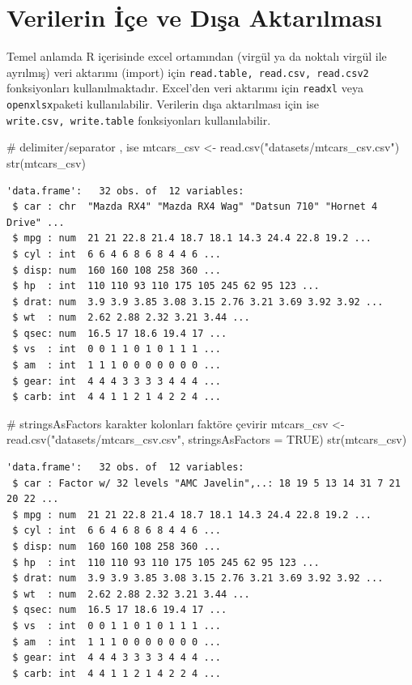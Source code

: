 \documentclass[
  letterpaper,
  DIV=11,
  numbers=noendperiod]{scrreprt}
\newenvironment{Shaded}{\begin{snugshade}}{\end{snugshade}}
\newcommand{\AttributeTok}[1]{\textcolor[rgb]{0.40,0.45,0.13}{#1}}
\newcommand{\CommentTok}[1]{\textcolor[rgb]{0.37,0.37,0.37}{#1}}
\newcommand{\ConstantTok}[1]{\textcolor[rgb]{0.56,0.35,0.01}{#1}}
\newcommand{\FunctionTok}[1]{\textcolor[rgb]{0.28,0.35,0.67}{#1}}
\newcommand{\NormalTok}[1]{\textcolor[rgb]{0.00,0.23,0.31}{#1}}
\newcommand{\OtherTok}[1]{\textcolor[rgb]{0.00,0.23,0.31}{#1}}
\newcommand{\StringTok}[1]{\textcolor[rgb]{0.13,0.47,0.30}{#1}}
\begin{document}
\chapter{Verilerin İçe ve Dışa
Aktarılması}\label{verilerin-iuxe7e-ve-dux131ux15fa-aktarux131lmasux131}

Temel anlamda R içerisinde excel ortamından (virgül ya da noktalı virgül
ile ayrılmış) veri aktarımı (import) için
\texttt{read.table,\ read.csv,\ read.csv2} fonksiyonları
kullanılmaktadır. Excel'den veri aktarımı için \texttt{readxl} veya
\texttt{openxlsx}paketi kullanılabilir. Verilerin dışa aktarılması için
ise \texttt{write.csv,\ write.table} fonksiyonları kullanılabilir.

\begin{Shaded}
\begin{Highlighting}[]
\CommentTok{\# delimiter/separator , ise}
\NormalTok{mtcars\_csv }\OtherTok{\textless{}{-}} \FunctionTok{read.csv}\NormalTok{(}\StringTok{"datasets/mtcars\_csv.csv"}\NormalTok{)}
\FunctionTok{str}\NormalTok{(mtcars\_csv)}
\end{Highlighting}
\end{Shaded}

\begin{verbatim}
'data.frame':   32 obs. of  12 variables:
 $ car : chr  "Mazda RX4" "Mazda RX4 Wag" "Datsun 710" "Hornet 4 Drive" ...
 $ mpg : num  21 21 22.8 21.4 18.7 18.1 14.3 24.4 22.8 19.2 ...
 $ cyl : int  6 6 4 6 8 6 8 4 4 6 ...
 $ disp: num  160 160 108 258 360 ...
 $ hp  : int  110 110 93 110 175 105 245 62 95 123 ...
 $ drat: num  3.9 3.9 3.85 3.08 3.15 2.76 3.21 3.69 3.92 3.92 ...
 $ wt  : num  2.62 2.88 2.32 3.21 3.44 ...
 $ qsec: num  16.5 17 18.6 19.4 17 ...
 $ vs  : int  0 0 1 1 0 1 0 1 1 1 ...
 $ am  : int  1 1 1 0 0 0 0 0 0 0 ...
 $ gear: int  4 4 4 3 3 3 3 4 4 4 ...
 $ carb: int  4 4 1 1 2 1 4 2 2 4 ...
\end{verbatim}

\begin{Shaded}
\begin{Highlighting}[]
\CommentTok{\# stringsAsFactors karakter kolonları faktöre çevirir}
\NormalTok{mtcars\_csv }\OtherTok{\textless{}{-}} \FunctionTok{read.csv}\NormalTok{(}\StringTok{"datasets/mtcars\_csv.csv"}\NormalTok{,}
                       \AttributeTok{stringsAsFactors =} \ConstantTok{TRUE}\NormalTok{)}
\FunctionTok{str}\NormalTok{(mtcars\_csv)}
\end{Highlighting}
\end{Shaded}

\begin{verbatim}
'data.frame':   32 obs. of  12 variables:
 $ car : Factor w/ 32 levels "AMC Javelin",..: 18 19 5 13 14 31 7 21 20 22 ...
 $ mpg : num  21 21 22.8 21.4 18.7 18.1 14.3 24.4 22.8 19.2 ...
 $ cyl : int  6 6 4 6 8 6 8 4 4 6 ...
 $ disp: num  160 160 108 258 360 ...
 $ hp  : int  110 110 93 110 175 105 245 62 95 123 ...
 $ drat: num  3.9 3.9 3.85 3.08 3.15 2.76 3.21 3.69 3.92 3.92 ...
 $ wt  : num  2.62 2.88 2.32 3.21 3.44 ...
 $ qsec: num  16.5 17 18.6 19.4 17 ...
 $ vs  : int  0 0 1 1 0 1 0 1 1 1 ...
 $ am  : int  1 1 1 0 0 0 0 0 0 0 ...
 $ gear: int  4 4 4 3 3 3 3 4 4 4 ...
 $ carb: int  4 4 1 1 2 1 4 2 2 4 ...
\end{verbatim}
\end{document}
